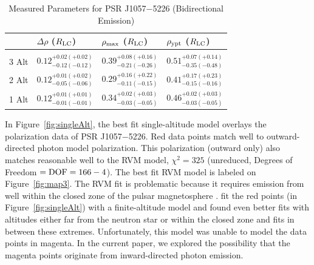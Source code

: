 \begin{table}[t!!]
\caption{Measured Parameters for PSR J1057$-$5226 (Bidirectional Emission)  }
\begin{center}
\begin{tabular}{llll}
\hline
&$\Delta \rho$ ($R_{\rm{LC}}$)& $\rho_{\rm{max}}$ ($R_{\rm{LC}}$)& $\rho_{\rm{ypt}}$ ($R_{\rm{LC}}$)\\
\hline & \\[-1em]\hline

3 Alt&$0.12^{+0.02(+0.02)}_{-0.12(-0.12)}$ & $0.39^{+0.08(+0.16)}_{-0.21(-0.26)}$ & $0.51^{+0.07(+0.14)}_{-0.35(-0.48)}$  \\ \hline
2 Alt&$0.12^{+0.01(+0.02)}_{-0.05(-0.06)}$ & $0.29^{+0.16(+0.22)}_{-0.11(-0.15)}$ & $0.41^{+0.17(+0.23)}_{-0.15(-0.16)}$  \\ \hline
1 Alt&$0.12^{+0.01(+0.01)}_{-0.01(-0.01)}$ & $0.34^{+0.02(+0.03)}_{-0.03(-0.05)}$ & $0.46^{+0.02(+0.03)}_{-0.03(-0.05)}$  \\ \hline

\end{tabular}
\label{tb:meas}
\end{center}
\end{table}

In Figure~\ref{fig:singleAlt}, the best fit single-altitude
model overlays the polarization data of PSR J1057$-$5226. 
Red data points match well to 
outward-directed photon model polarization.  This polarization (outward only)
also matches reasonable well to the RVM model, $\chi^2=325$ (unreduced, Degrees of Freedom $=\rm{DOF}=166-4$).
The best fit RVM model is labeled on Figure~\ref{fig:map3}.
The RVM fit is problematic because it requires emission
from well within the closed zone of the pulsar magnetosphere
\citep{weltevrede2009mapping}.  \cite{craig2014tackling}  fit the red points (in Figure~\ref{fig:singleAlt})
with a finite-altitude model and found even better
fits with altitudes either far from the neutron star or within
the closed zone and fits in between these extremes.  Unfortunately, this model
was unable to model the data points in magenta. 
In the current paper, 
we explored the possibility that 
the magenta points originate from inward-directed photon emission.

